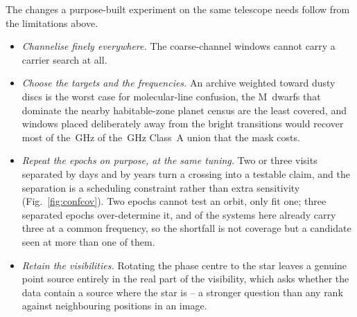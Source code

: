 The changes a purpose-built experiment on the same telescope needs follow from
the limitations above.

\begin{itemize}[leftmargin=1.2em,itemsep=2pt,topsep=3pt,parsep=0pt]
\item \emph{Channelise finely everywhere.} The \NCoarse{} coarse-channel
windows cannot carry a carrier search at all.
\item \emph{Choose the targets and the frequencies.} An archive weighted
toward dusty discs is the worst case for molecular-line confusion, the
M~dwarfs that dominate the nearby habitable-zone planet census are the least
covered, and windows placed deliberately away from the bright transitions
would recover most of the \MkMaskAGHz\,GHz of the \CvUnionA\,GHz Class~A
union that the mask costs.
\item \emph{Repeat the epochs on purpose, at the same tuning.} Two or three
visits separated by days and by years turn a crossing into a testable claim,
and the separation is a scheduling constraint rather than extra sensitivity
(Fig.~\ref{fig:confcov}). Two epochs cannot test an orbit, only fit one;
three separated epochs over-determine it, and \PaNSysThree{} of the
\NSysClassA{} systems here already carry three at a common frequency, so the
shortfall is not coverage but a candidate seen at more than one of them.
\item \emph{Retain the visibilities.} Rotating the phase centre to the star
leaves a genuine point source entirely in the real part of the visibility,
which asks whether the data contain a source where the star is -- a stronger
question than any rank against neighbouring positions in an image.
\end{itemize}

